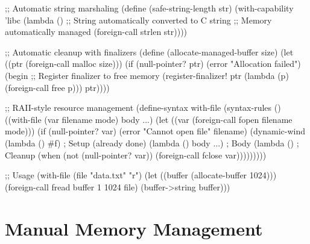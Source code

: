 \begin{example}
\begin{lambdustcode}
;; Automatic string marshaling
(define (safe-string-length str)
  (with-capability 'libc
    (lambda ()
      ;; String automatically converted to C string
      ;; Memory automatically managed
      (foreign-call strlen str))))

;; Automatic cleanup with finalizers
(define (allocate-managed-buffer size)
  (let ((ptr (foreign-call malloc size)))
    (if (null-pointer? ptr)
        (error "Allocation failed")
        (begin
          ;; Register finalizer to free memory
          (register-finalizer! ptr (lambda (p) (foreign-call free p)))
          ptr))))

;; RAII-style resource management
(define-syntax with-file
  (syntax-rules ()
    ((with-file (var filename mode) body ...)
     (let ((var (foreign-call fopen filename mode)))
       (if (null-pointer? var)
           (error "Cannot open file" filename)
           (dynamic-wind
             (lambda () #f)           ; Setup (already done)
             (lambda () body ...)     ; Body
             (lambda ()               ; Cleanup
               (when (not (null-pointer? var))
                 (foreign-call fclose var)))))))))

;; Usage
(with-file (file "data.txt" "r")
  (let ((buffer (allocate-buffer 1024)))
    (foreign-call fread buffer 1 1024 file)
    (buffer->string buffer)))
\end{lambdustcode}
\end{example}

\section{Manual Memory Management}
\label{sec:manual-memory}

